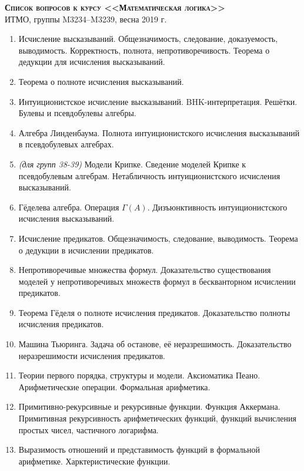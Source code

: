 \documentclass[11pt,a4paper,oneside]{scrartcl}
\begin{document}
\pagestyle{empty}

\begin{center}
{\large\scshape\bfseries Список вопросов к курсу <<Математическая логика>>}\\
ИТМО, группы M3234--M3239, весна 2019 г.
\end{center}


\begin{enumerate}
\item Исчисление высказываний. Общезначимость, следование, доказуемость, выводимость. Корректность, полнота, непротиворечивость.
Теорема о дедукции для исчисления высказываний.
\item Теорема о полноте исчисления высказываний.
\item Интуиционистское исчисление высказываний. BHK-интерпретация. Решётки. Булевы и псевдобулевы алгебры.
\item Алгебра Линденбаума. Полнота интуиционистского исчисления высказываний в псевдобулевых алгебрах.
\item \emph{(для групп 38-39)} Модели Крипке. Сведение моделей Крипке к псевдобулевым алгебрам. Нетабличность 
интуиционистского исчисления высказываний.
\item Гёделева алгебра. Операция $\Gamma(A)$. Дизъюнктивность интуиционистского исчисления высказываний.
\item Исчисление предикатов. Общезначимость, следование, выводимость. Теорема о дедукции в исчислении предикатов.
\item Непротиворечивые множества формул. Доказательство существования моделей у непротиворечивых множеств формул 
в бескванторном исчислении предикатов.
\item Теорема Гёделя о полноте исчисления предикатов. Доказательство полноты исчисления предикатов.
\item Машина Тьюринга. Задача об останове, её неразрешимость. Доказательство неразрешимости исчисления предикатов.
\item Теории первого порядка, структуры и модели. Аксиоматика Пеано. Арифметические операции. Формальная арифметика. 
\item Примитивно-рекурсивные и рекурсивные функции. Функция Аккермана. Примитивная рекурсивность 
арифметических функций, функций вычисления простых чисел, частичного логарифма.
\item Выразимость отношений и представимость функций в формальной арифметике. Харктеристические функции.

\end{enumerate}
\end{document}
